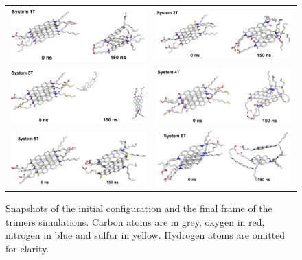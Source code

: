 \begin{figure}[H]
	\begin{tabular}{cc}
		\includegraphics[width=0.45\columnwidth]{image/Figure3a}&
		\includegraphics[width=0.45\columnwidth]{image/Figure3b}\\
		\includegraphics[width=0.45\columnwidth]{image/Figure3c}&
		\includegraphics[width=0.45\columnwidth]{image/Figure3d}\\
		\includegraphics[width=0.45\columnwidth]{image/Figure3e}&
		\includegraphics[width=0.45\columnwidth]{image/Figure3f}\\                
	\end{tabular}
	\caption{Snapshots of the initial configuration and the final frame of the trimers simulations. Carbon atoms are in grey, oxygen in red, nitrogen in blue and sulfur in yellow. Hydrogen atoms are omitted for clarity.}
	\label{pap:fig05}
\end{figure}


